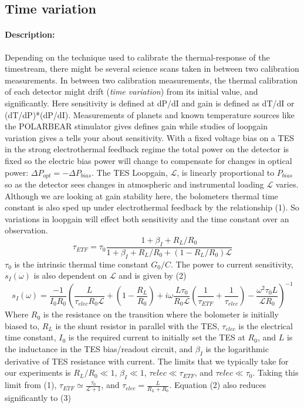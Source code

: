\subsection{Time variation}

\paragraph{Description:}
Depending on the technique used to calibrate the thermal-response of the timestream, there might be several science scans taken in between two calibration measurements. 
In between two calibration measurements, the thermal calibration of each detector might drift (\emph{time variation}) from its initial value, and significantly. Here sensitivity is defined at dP/dI and gain is defined as dT/dI or (dT/dP)*(dP/dI). Measurements of planets and known temperature sources like the POLARBEAR stimulator gives defines gain while studies of loopgain variation gives a tells your about sensitivity. With a fixed voltage bias on a TES in the strong electrothermal feedback regime the total power on the detector is fixed so the electric bias power will change to compensate for changes in optical power: $\Delta P_{opt}=-\Delta P_{bias}$. The TES Loopgain, $\mathcal{L}$, is linearly proportional to $P_{bias}$ so as the detector sees changes in atmospheric and instrumental loading $\mathcal{L}$ varies. Although we are looking at gain stability here, the bolometers thermal time constant is also sped up under electrothermal feedback by the relationship (1). So variations in loopgain will effect both sensitivity and the time constant over an observation.
\begin{equation}
\tau_{ETF}=\tau_0\frac{1+\beta_I+R_L/R_0}{1+\beta_I+R_L/R_0+(1-R_L/R_0)\mathcal{L}}
\end{equation}
$\tau_0$ is the intrinsic thermal time constant $G_0/C$. The power to current sensitivity, $s_I(\omega)$ is also dependent on $\mathcal{L}$ and is given by (2)
\begin{equation}
s_I(\omega)=\frac{-1}{I_0R_0}\left(\frac{L}{\tau_{elec}R_0\mathcal{L}}+(1-\frac{R_L}{R_0})+i\omega\frac{L\tau_0}{R_0\mathcal{L}}(\frac{1}{\tau_{ETF}}+\frac{1}{\tau_{elec}})-\frac{\omega^2\tau_0L}{\mathcal{L}R_0}\right)^{-1}
\end{equation}
Where $R_0$ is the resistance on the transition where the bolometer is initially biased to, $R_L$ is the shunt resistor in parallel with the TES, $\tau_{elec}$ is the electrical time constant, $I_0$ is the required current to initially set the TES at $R_0$, and $L$ is the inductance in the TES bias/readout circuit, and $\beta_I$ is the logarithmic derivative of TES resistance with current. The limits that we typically take for our experiments is $R_L/R_0 \ll 1$, $\beta_I \ll 1$, $\tau{elec} \ll \tau_{ETF}$, and $\tau{elec} \ll \tau_0$. Taking this limit from (1), $\tau_{ETF} \simeq \frac{\tau_0}{\mathcal{L}+1}$, and $\tau_{elec} = \frac{L}{R_L+R_0}$. Equation (2) also reduces  significantly to (3)
